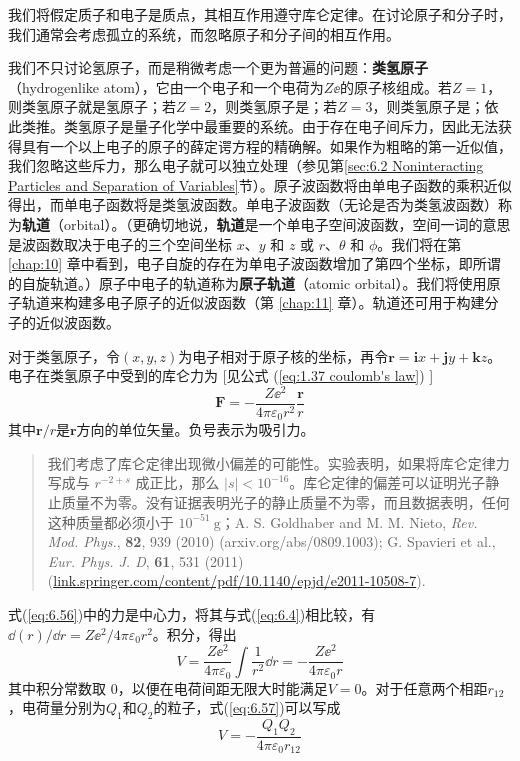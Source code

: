     我们将假定质子和电子是质点，其相互作用遵守库仑定律。在讨论原子和分子时，我们通常会考虑孤立的系统，而忽略原子和分子间的相互作用。

    我们不只讨论氢原子，而是稍微考虑一个更为普遍的问题：\textbf{类氢原子}（hydrogenlike atom），它由一个电子和一个电荷为$Z\ee $的原子核组成。若$Z=1$，则类氢原子就是氢原子；若$Z=2$，则类氢原子是；若$Z=3$，则类氢原子是；依此类推。类氢原子是量子化学中最重要的系统。由于存在电子间斥力，因此无法获得具有一个以上电子的原子的薛定谔方程的精确解。如果作为粗略的第一近似值，我们忽略这些斥力，那么电子就可以独立处理（参见第\ref{sec:6.2 Noninteracting Particles and Separation of Variables}节）。原子波函数将由单电子函数的乘积近似得出，而单电子函数将是类氢波函数。单电子波函数（无论是否为类氢波函数）称为\textbf{轨道}（orbital）。（更确切地说，\textbf{轨道}是一个单电子空间波函数，空间一词的意思是波函数取决于电子的三个空间坐标 $x$、$y$ 和 $z$ 或 $r$、$\theta$ 和 $\phi$。我们将在第 \ref{chap:10} 章中看到，电子自旋的存在为单电子波函数增加了第四个坐标，即所谓的自旋轨道。）原子中电子的轨道称为\textbf{原子轨道}（atomic orbital）。我们将使用原子轨道来构建多电子原子的近似波函数（第 \ref{chap:11} 章）。轨道还可用于构建分子的近似波函数。

    对于类氢原子，令$\left(x,y,z\right)$为电子相对于原子核的坐标，再令$\mathbf{r} = \mathbf{i}x+\mathbf{j}y+\mathbf{k}z$。电子在类氢原子中受到的库仑力为 [见公式 (\ref{eq:1.37 coulomb's law}) ]
    \begin{equation}
        \mathbf{F} = -\frac{Z\ee ^2}{4\pi\varepsilon_0r^2}\frac{\mathbf{r}}{r}
        \label{eq:6.56}
    \end{equation}
    其中$\mathbf{r}/r$是$\mathbf{r}$方向的单位矢量。负号表示为吸引力。

    \begin{quote}
        \small
        我们考虑了库仑定律出现微小偏差的可能性。实验表明，如果将库仑定律力写成与 $r^{-2+s}$ 成正比，那么 $\left|s\right|<10^{-16}$。库仑定律的偏差可以证明光子静止质量不为零。没有证据表明光子的静止质量不为零，而且数据表明，任何这种质量都必须小于 $10^{-51} \: \mathrm{g}$；A. S. Goldhaber and M. M. Nieto, \textit{Rev. Mod. Phys.}, \textbf{82}, 939 (2010) (arxiv.org/abs/0809.1003); G. Spavieri et al., \textit{Eur. Phys. J. D}, \textbf{61}, 531 (2011) (\url{link.springer.com/content/pdf/10.1140/epjd/e2011-10508-7}).
    \end{quote}

    式(\ref{eq:6.56})中的力是中心力，将其与式(\ref{eq:6.4})相比较，有$\dd \left(r\right)/\dd r = Z\ee ^2/4\pi\varepsilon_0r^2$。积分，得出
    \begin{equation}
        V = \frac{Z\ee ^2}{4\pi\varepsilon_0}\int\frac{1}{r^2}\dd r = -\frac{Z\ee ^2}{4\pi\varepsilon_0r}
        \label{eq:6.57}
    \end{equation}
    其中积分常数取 0，以便在电荷间距无限大时能满足$V=0$。对于任意两个相距$r_{12}$，电荷量分别为$Q_1$和$Q_2$的粒子，式(\ref{eq:6.57})可以写成
    \begin{equation}
        \boxed{
            V = -\frac{Q_1Q_2}{4\pi\varepsilon_0r_{12}}
        }
        \label{eq:6.58}
    \end{equation}

